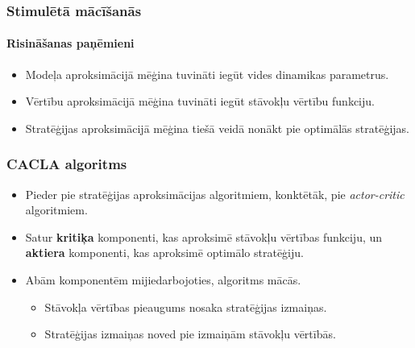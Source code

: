 \documentclass[xetex,mathserif]{beamer}
\begin{document}
  
  \begin{frame}
    \frametitle{Stimulētā mācīšanās}
    \framesubtitle{Risināšanas paņēmieni}
    \begin{itemize}
      \item Modeļa aproksimācijā mēģina tuvināti iegūt vides dinamikas parametrus.
      \item Vērtību aproksimācijā mēģina tuvināti iegūt stāvokļu vērtību funkciju.
      \item Stratēģijas aproksimācijā mēģina tiešā veidā nonākt pie optimālās
        stratēģijas.
    \end{itemize}
  \end{frame}


  \begin{frame}
    \frametitle{CACLA algoritms}
    \begin{itemize}
      \item Pieder pie stratēģijas aproksimācijas algoritmiem, konktētāk, pie
        \textit{actor-critic} algoritmiem.
      \item Satur \textbf{kritiķa} komponenti, kas aproksimē stāvokļu vērtības
        funkciju, un \textbf{aktiera} komponenti, kas aproksimē optimālo stratēģiju.
      \item Abām komponentēm mijiedarbojoties, algoritms mācās.
        \begin{itemize}
          \item Stāvokļa vērtības pieaugums nosaka stratēģijas izmaiņas.
          \item Stratēģijas izmaiņas noved pie izmaiņām stāvokļu vērtībās.
        \end{itemize}
    \end{itemize}
  \end{frame}
\end{document}
